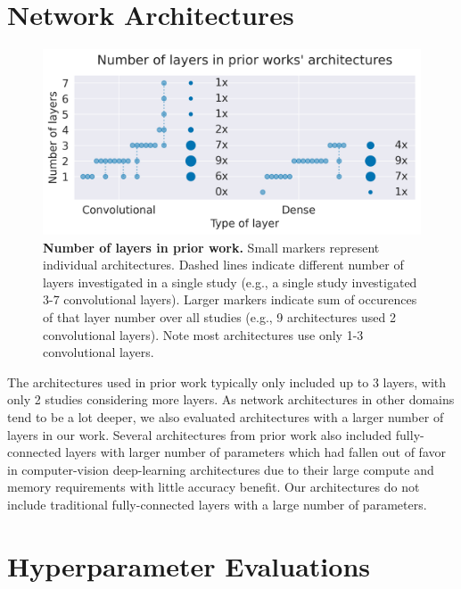 \section{Network Architectures}

    

\begin{figure}[ht]
    \myfloatalign
    \includegraphics[width=0.9\linewidth,trim={0 0 0 1cm},clip]{images/number-layers.png}
    \caption[Number of layers in prior work.]{
\textbf{Number of layers in prior work.} Small markers represent
individual architectures. Dashed lines indicate different number of
layers investigated in a single study (e.g., a single study investigated
3-7 convolutional layers). Larger markers indicate sum of
occurences of that layer number over all studies (e.g., 9 architectures
used 2 convolutional layers). Note most architectures use only 1-3
convolutional layers.}\label{layernum_fig}
\end{figure}

    The architectures used in prior work typically only included up to 3
layers, with only 2 studies considering more layers. As network
architectures in other domains tend to be a lot deeper, we also
evaluated architectures with a larger number of layers in our work.
Several architectures from prior work also included fully-connected
layers with larger number of parameters which had fallen out of favor in
computer-vision deep-learning architectures due to their large compute
and memory requirements with little accuracy benefit. Our architectures
do not include traditional fully-connected layers with a large number of
parameters.



\section{Hyperparameter Evaluations}\label{hyperparameter-evaluations}

